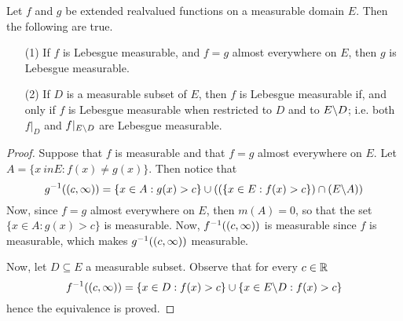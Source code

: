 \begin{lemma}\label{9.1.4}
    Let $f$ and $g$ be extended realvalued functions on a measurable domain $E$.
    Then the following are true.
    \begin{enumerate}
        \item[(1)] If $f$ is Lebesgue measurable, and $f=g$ almost everywhere on
            $E$, then $g$ is Lebesgue measurable.

        \item[(2)] If $D$ is a measurable subset of  $E$, then  $f$ is
            Lebesgue measurable if, and  only if $f$ is Lebesgue measurable when
            restricted to $D$ and to  $E \backslash D$; i.e. both $f|_D$ and
            $f|_{E \backslash D}$ are Lebesgue measurable.
    \end{enumerate}
\end{lemma}
\begin{proof}
    Suppose that $f$ is measurable and that $f=g$ almost everywhere on $E$. Let
    $A=\{x\ in E : f(x) \neq g(x)\}$. Then notice that
    \begin{equation*}
        g^{-1}((c,\infty))=\{x \in A : g(x)>c\} \cup ((\{x \in E : f(x)>c\})
        \cap (E \backslash A))
    \end{equation*}
    Now, since $f=g$ almost everywhere on $E$, then  $m(A)=0$, so that the set
    $\{x \in A : g(x)>c\}$ is measurable. Now, $f^{-1}((c,\infty))$ is
    measurable since $f$ is measurable, which makes  $g^{-1}((c,\infty))$
    measurable.

    Now, let $D \subseteq E$ a measurable subset. Observe that for every  $c \in
    \mathbb{R}$
    \begin{equation*}
        f^{-1}((c,\infty))=\{x \in D : f(x)>c\} \cup \{x \in E \backslash D :
        f(x)>c\}
    \end{equation*}
    hence the equivalence is proved.
\end{proof}

